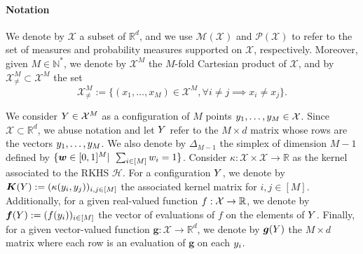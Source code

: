 \paragraph{Notation} We denote by $\mathcal{X}$ a subset of $\mathbb{R}^{d}$, and we use  $\mathcal{M}(\mathcal{X})$ and $\mathcal{P}(\mathcal{X})$ to refer to the set of measures and probability measures supported on $\mathcal{X}$, respectively. Moreover, given $M \in \mathbb{N}^{*}$, we denote by
$\mathcal{X}^{M}$ the $M$-fold Cartesian product of $\mathcal{X}$, and by $\mathcal{X}_{\neq}^{M} \subset \mathcal{X}^{M}$ the set
\begin{equation*}
  \mathcal{X}^{M}_{\neq}:= \{ (x_1, \dots,x_M) \in \mathcal{X}^{M}, \forall i\neq j \implies x_i \neq x_j \}.
\end{equation*}


We consider $Y \in \mathcal{X}^{M}$ as a configuration of $M$ points $y_{1}, \dots, y_{M} \in \mathcal{X}$. Since $\mathcal{X} \subset \mathbb{R}^{d}$, we abuse notation and let $Y$ refer to the $M \times d$ matrix whose rows are the vectors $y_{1}, \dots, y_{M}$. We also denote by $\Delta_{M-1}$ the simplex of dimension $M-1$ defined by
$\{ \bm{w} \in [0,1]^{M}| \:\: \sum_{i \in [M]} w_{i} = 1 \}$. Consider $\kappa:\mathcal{X}\times\mathcal{X}\to\mathbb{R}$ as the kernel associated to the RKHS $\mathcal{H}$. For a configuration $Y$, we denote by $\bm{K}(Y):= (\kappa(y_i,y_j))_{i,j \in [M]}$ the associated kernel matrix for $i,j \in [M]$. Additionally, for a given real-valued function $f: \mathcal{X} \rightarrow \mathbb{R}$, we denote by $\bm{f}(Y) := (f(y_i))_{i \in [M]}$ the vector of evaluations of $f$ on the elements of $Y$. Finally, for a given vector-valued function $\bm{g}: \mathcal{X} \rightarrow \mathbb{R}^{d}$, we denote by $\bm{g}(Y)$ the $M \times d$ matrix where each row is an evaluation of $\bm{g}$ on each $y_{i}$.
